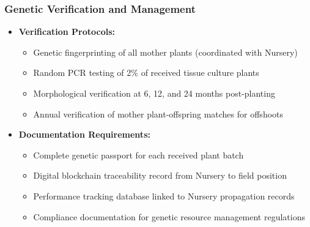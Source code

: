 \subsubsection{Genetic Verification and Management}
\begin{itemize}
    \item \textbf{Verification Protocols:}
    \begin{itemize}
        \item Genetic fingerprinting of all mother plants (coordinated with Nursery)
        \item Random PCR testing of 2\% of received tissue culture plants
        \item Morphological verification at 6, 12, and 24 months post-planting
        \item Annual verification of mother plant-offspring matches for offshoots
    \end{itemize}
    \item \textbf{Documentation Requirements:}
    \begin{itemize}
        \item Complete genetic passport for each received plant batch
        \item Digital blockchain traceability record from Nursery to field position
        \item Performance tracking database linked to Nursery propagation records
        \item Compliance documentation for genetic resource management regulations
    \end{itemize}
\end{itemize}

